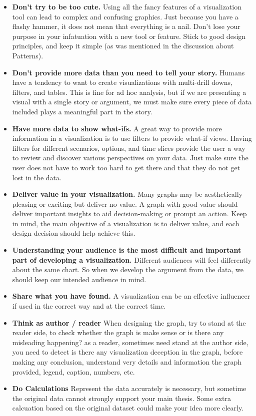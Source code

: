 \documentclass[]{book}
\theoremstyle{definition}
\theoremstyle{definition}
\theoremstyle{definition}
\theoremstyle{remark}
\begin{document}
\begin{itemize}
\item
  \textbf{Don't try to be too cute.} Using all the fancy features of a
  visualization tool can lead to complex and confusing graphics. Just
  because you have a flashy hammer, it does not mean that everything is
  a nail. Don't lose your purpose in your infatuation with a new tool or
  feature. Stick to good design principles, and keep it simple (as was
  mentioned in the discussion about Patterns).
\item
  \textbf{Don't provide more data than you need to tell your story.}
  Humans have a tendency to want to create visualizations with
  multi-drill downs, filters, and tables. This is fine for ad hoc
  analysis, but if we are presenting a visual with a single story or
  argument, we must make sure every piece of data included plays a
  meaningful part in the story.
\item
  \textbf{Have more data to show what-ifs.} A great way to provide more
  information in a visualization is to use filters to provide what-if
  views. Having filters for different scenarios, options, and time
  slices provide the user a way to review and discover various
  perspectives on your data. Just make sure the user does not have to
  work too hard to get there and that they do not get lost in the data.
\item
  \textbf{Deliver value in your visualization.} Many graphs may be
  aesthetically pleasing or exciting but deliver no value. A graph with
  good value should deliver important insights to aid decision-making or
  prompt an action. Keep in mind, the main objective of a visualization
  is to deliver value, and each design decision should help achieve
  this.
\item
  \textbf{Understanding your audience is the most difficult and
  important part of developing a visualization.} Different audiences
  will feel differently about the same chart. So when we develop the
  argument from the data, we should keep our intended audience in mind.
\item
  \textbf{Share what you have found.} A visualization can be an
  effective influencer if used in the correct way and at the correct
  time.
\item
  \textbf{Think as author / reader} When designing the graph, try to
  stand at the reader side, to check whether the graph is make sense or
  is there any misleading happening? as a reader, sometimes need stand
  at the author side, you need to detect is there any visualization
  deception in the graph, before making any conclusion, understand very
  details and information the graph provided, legend, caption, numbers,
  etc.
\item
  \textbf{Do Calculations} Represent the data accurately is necessary,
  but sometime the original data cannot strongly support your main
  thesis. Some extra calcuation based on the original dataset could make
  your idea more clearly.
\end{itemize}
\end{document}
